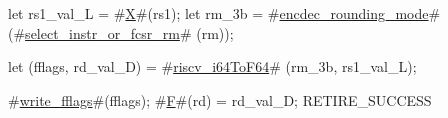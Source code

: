 let rs1_val_L = #\hyperref[sailRISCVzX]{X}#(rs1);
let rm_3b     = #\hyperref[sailRISCVzencdeczyroundingzymode]{encdec\_rounding\_mode}# (#\hyperref[sailRISCVzselectzyinstrzyorzyfcsrzyrm]{select\_instr\_or\_fcsr\_rm}#  (rm));

let (fflags, rd_val_D) = #\hyperref[sailRISCVzriscvzyi64ToF64]{riscv\_i64ToF64}# (rm_3b, rs1_val_L);

#\hyperref[sailRISCVzwritezyfflags]{write\_fflags}#(fflags);
#\hyperref[sailRISCVzF]{F}#(rd) = rd_val_D;
RETIRE_SUCCESS
